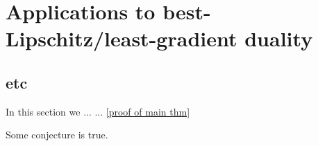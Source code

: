 
\section{Applications to best-Lipschitz/least-gradient duality}\label{BestDuality}

\subsection{etc}

In this section we ... \cite{thurston1998minimal} \cite{daskalopoulos2020transverse}... \ref{proof of main thm}

\begin{theorem} \label{small theorem}
Some conjecture is true.
\end{theorem}





